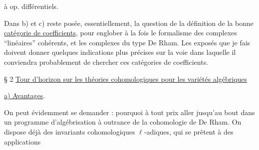 à  op. différentiels.

Dans b) et c) reste posée, essentiellement, la question de la définition de la bonne \uline{catégorie de coefficients}, pour englober à la fois le formalisme des complexes  ``linéaires'' cohérents, et les complexes du type De Rham.
Les exposés que je fais doivent donner quelques indications plus précises sur la voie  dans laquelle il conviendra  probablement de chercher ces catégories de coefficients.

§ 2 \uline{Tour d'horizon sur les  théories cohomologiques  pour les variétés algébriques}

\uline{a) Avantages}. 

On peut évidemment se demander : pourquoi à tout prix  aller jusqu'au bout dans un programme d'algébrisation  à outrance de la cohomologie de De Rham.
On dispose déjà des invariants cohomologiques $\ell$-adiques, qui se prêtent à des applications 
